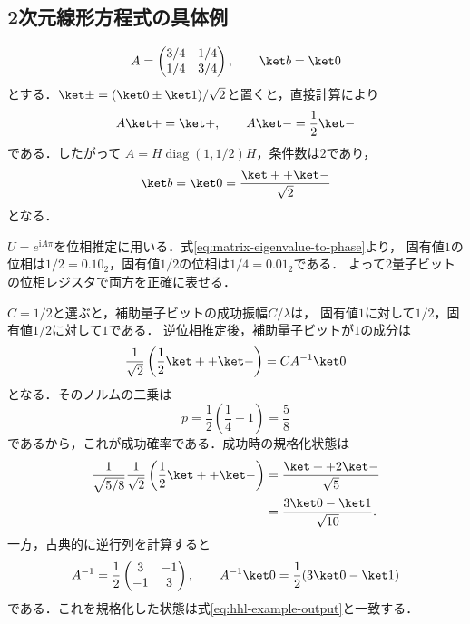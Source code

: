 \subsection{2次元線形方程式の具体例}
\label{sec:hhl-example-2d}

\begin{ex}
\begin{equation}
 A=\begin{pmatrix}3/4&1/4\\1/4&3/4\end{pmatrix},
 \qquad \ket b=\ket0
 \label{eq:hhl-example-data}
\end{equation}
とする．$\ket\pm=(\ket0\pm\ket1)/\sqrt2$と置くと，直接計算により
\[
 A\ket+=\ket+,
 \qquad A\ket-=\frac12\ket-
\]
である．したがって
$A=H\operatorname{diag}(1,1/2)H$，条件数は$2$であり，
\begin{equation}
 \ket b=\ket0=\frac{\ket++\ket-}{\sqrt2}
 \label{eq:hhl-example-input-eigenbasis}
\end{equation}
となる．

$U=e^{\mathrm{i}A\pi}$を位相推定に用いる．式\eqref{eq:matrix-eigenvalue-to-phase}より，
固有値$1$の位相は$1/2=0.10_2$，固有値$1/2$の位相は$1/4=0.01_2$である．
よって2量子ビットの位相レジスタで両方を正確に表せる．

$C=1/2$と選ぶと，補助量子ビットの成功振幅$C/\lambda$は，
固有値$1$に対して$1/2$，固有値$1/2$に対して$1$である．
逆位相推定後，補助量子ビットが$1$の成分は
\begin{equation}
 \frac1{\sqrt2}\left(\frac12\ket++\ket-\right)
 =CA^{-1}\ket0
 \label{eq:hhl-example-success-component}
\end{equation}
となる．そのノルムの二乗は
\[
 p=\frac12\left(\frac14+1\right)=\frac58
\]
であるから，これが成功確率である．成功時の規格化状態は
\begin{align}
 \frac{1}{\sqrt{5/8}}
 \frac1{\sqrt2}\left(\frac12\ket++\ket-\right)
 &=\frac{\ket++2\ket-}{\sqrt5}\\
 &=\frac{3\ket0-\ket1}{\sqrt{10}}.
 \label{eq:hhl-example-output}
\end{align}
一方，古典的に逆行列を計算すると
\[
 A^{-1}=\frac12\begin{pmatrix}3&-1\\-1&3\end{pmatrix},
 \qquad A^{-1}\ket0=\frac12(3\ket0-\ket1)
\]
である．これを規格化した状態は式\eqref{eq:hhl-example-output}と一致する．
\end{ex}


